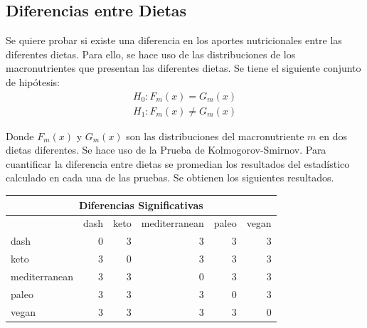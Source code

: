 \documentclass[12pt,a4paper]{article}
\begin{document}
{        \subsection{Diferencias entre Dietas}
        {
            Se quiere probar si
            existe una diferencia en los aportes nutricionales entre las diferentes 
            dietas. Para ello, se hace uso de las distribuciones de los macronutrientes 
            que presentan las diferentes dietas. Se tiene el siguiente conjunto de  
            hipótesis:
            \begin{align*}
                H_0 : F_m(x) = G_m(x) \\
                H_1 : F_m(x) \ne G_m(x)
            \end{align*}

            Donde $F_m(x)$ y $G_m(x)$ son las distribuciones del macronutriente $m$ en 
            dos dietas diferentes. Se hace uso de la Prueba de Kolmogorov-Smirnov. Para 
            cuantificar la diferencia entre dietas 
            se promedian los resultados del estadístico calculado en cada una de las pruebas.
            Se obtienen los siguientes resultados.

            \begin{center}
                \begin{tabular}{lrrrrr}
                \toprule
                    \multicolumn{6}{c}{Diferencias Significativas} \\
                \midrule
                    & dash & keto & mediterranean & paleo & vegan \\
                \midrule
                    dash & 0 & 3 & 3 & 3 & 3 \\
                    keto & 3 & 0 & 3 & 3 & 3 \\
                    mediterranean & 3 & 3 & 0 & 3 & 3 \\
                    paleo & 3 & 3 & 3 & 0 & 3 \\
                    vegan & 3 & 3 & 3 & 3 & 0 \\
                \bottomrule
                \end{tabular}
            \end{center}
            
}}
\end{document}
